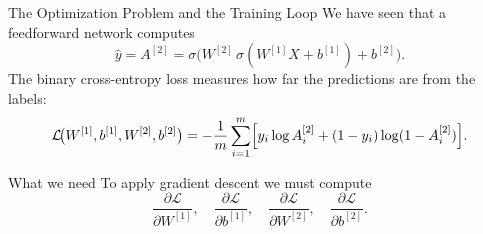 \documentclass[11pt,aspectratio=169,professionalfonts]{beamer}
\begin{document}
%
%
\begin{frame}{The Optimization Problem and the Training Loop}
We have seen that a feedforward network computes
\[
\hat{y} = A^{[2]} = \sigma\!\bigl(W^{[2]}\,\sigma(W^{[1]}X + b^{[1]}) + b^{[2]}\bigr).
\]
The binary cross-entropy loss measures how far the predictions are from the labels:
\[
\mathcal{L}\!\bigl(W^{[1]}, b^{[1]}, W^{[2]}, b^{[2]}\bigr)
= -\frac{1}{m}\sum_{i=1}^{m}\Bigl[y_i\log A^{[2]}_i + (1-y_i)\log(1-A^{[2]}_i)\Bigr].
\]

\vspace{0.15cm}
\begin{block}{What we need}
To apply gradient descent we must compute
\[
\frac{\partial \mathcal{L}}{\partial W^{[1]}},\quad
\frac{\partial \mathcal{L}}{\partial b^{[1]}},\quad
\frac{\partial \mathcal{L}}{\partial W^{[2]}},\quad
\frac{\partial \mathcal{L}}{\partial b^{[2]}}.
\]
\end{block}
\end{frame}
%
%
\end{document}

